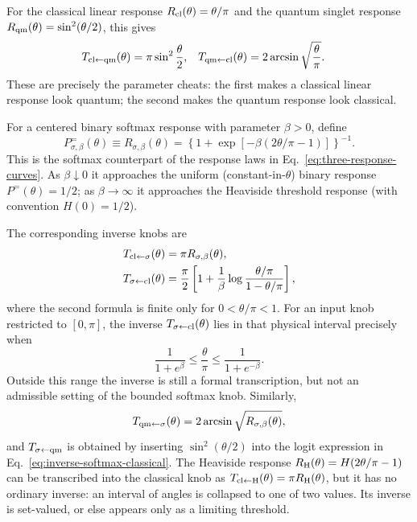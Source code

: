 \documentclass[aps,pra,reprint,superscriptaddress,nofootinbib,floatfix]{revtex4-2}
\begin{document}
For the classical linear response
\(R_{\rm cl}(\theta)=\theta/\pi\) and the quantum singlet response
\(R_{\rm qm}(\theta)=\sin^2(\theta/2)\), this gives
\begin{align}
        T_{{\rm cl}\leftarrow{\rm qm}}(\theta)
        &=\pi\sin^2\frac{\theta}{2},&
        T_{{\rm qm}\leftarrow{\rm cl}}(\theta)
        &=2\arcsin\sqrt{\frac{\theta}{\pi}}.
        \label{eq:inverse-classical-quantum}
\end{align}
These are precisely the parameter cheats: the first makes a classical linear
response look quantum; the second makes the quantum response look classical.

For a centered binary softmax response with parameter \(\beta > 0\), define
\begin{equation}
        P^{=}_{\sigma,\beta}(\theta)
        \equiv R_{\sigma,\beta}(\theta)
        =
        \left\{1+\exp[-\beta(2\theta/\pi-1)]\right\}^{-1}.
        \label{eq:binary-softmax-angle}
\end{equation}
This is the softmax counterpart of the response laws in
Eq.~\eqref{eq:three-response-curves}.  As \(\beta\downarrow0\) it approaches
the uniform (constant-in-$\theta$) binary response \(P^{=}(\theta)=1/2\); as \(\beta\to\infty\) it
approaches the Heaviside threshold response (with convention \(H(0)=1/2\)).



The corresponding inverse knobs are
\begin{align}
        T_{{\rm cl}\leftarrow\sigma}(\theta)
        &=
        \pi R_{\sigma,\beta}(\theta),
        \label{eq:inverse-classical-softmax}\\
        T_{\sigma\leftarrow{\rm cl}}(\theta)
        &=
        \frac{\pi}{2}
        \left[
        1+\frac{1}{\beta}
        \log\frac{\theta/\pi}{1-\theta/\pi}
        \right],
        \label{eq:inverse-softmax-classical}
\end{align}
where the second formula is finite only for \(0<\theta/\pi<1\).  For an input
knob restricted to \([0,\pi]\), the inverse
\(T_{\sigma\leftarrow{\rm cl}}(\theta)\) lies in that physical interval
precisely when
\begin{equation}
        \frac{1}{1+e^\beta}
        \le
        \frac{\theta}{\pi}
        \le
        \frac{1}{1+e^{-\beta}}.
        \label{eq:softmax-inverse-domain}
\end{equation}
Outside this range the inverse is still a formal transcription, but not an
admissible setting of the bounded softmax knob.  Similarly,
\[
        T_{{\rm qm}\leftarrow\sigma}(\theta)
        =
        2\arcsin\sqrt{R_{\sigma,\beta}(\theta)},
\]
and \(T_{\sigma\leftarrow{\rm qm}}\) is obtained by inserting
\(\sin^2(\theta/2)\) into the logit expression in
Eq.~\eqref{eq:inverse-softmax-classical}.  The Heaviside response
\(R_{\rm H}(\theta)=H(2\theta/\pi-1)\) can be transcribed into the classical
knob as
\(T_{{\rm cl}\leftarrow{\rm H}}(\theta)=\pi R_{\rm H}(\theta)\), but it has
no ordinary inverse: an interval of angles is collapsed to one of two values.
Its inverse is set-valued, or else appears only as a limiting threshold.
\end{document}
